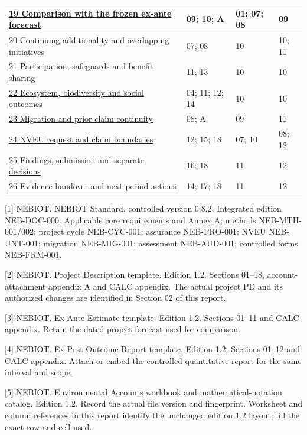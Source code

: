 {\begin{longtable}{@{}P{83mm}P{26mm}P{24mm}P{24mm}@{}}
\hyperref[mr:19]{19 Comparison with the frozen ex-ante forecast} & 09; 10; A & 01; 07; 08 & 09\\\hline
\hyperref[mr:20]{20 Continuing additionality and overlapping initiatives} & 07; 08 & 10 & 10; 11\\\hline
\hyperref[mr:21]{21 Participation, safeguards and benefit-sharing} & 11; 13 & 10 & 10\\\hline
\hyperref[mr:22]{22 Ecosystem, biodiversity and social outcomes} & 04; 11; 12; 14 & 10 & 10\\\hline
\hyperref[mr:23]{23 Migration and prior claim continuity} & 08; A & 09 & 11\\\hline
\hyperref[mr:24]{24 NVEU request and claim boundaries} & 12; 15; 18 & 07; 10 & 08; 12\\\hline
\hyperref[mr:25]{25 Findings, submission and separate decisions} & 16; 18 & 11 & 12\\\hline
\hyperref[mr:26]{26 Evidence handover and next-period actions} & 14; 17; 18 & 11 & 12\\\hline
\end{longtable}}
[1] NEBIOT. NEBIOT Standard, controlled version 0.8.2. Integrated edition NEB-DOC-000. Applicable core requirements and Annex A; methods NEB-MTH-001/002; project cycle NEB-CYC-001; assurance NEB-PRO-001; NVEU NEB-UNT-001; migration NEB-MIG-001; assessment NEB-AUD-001; controlled forms NEB-FRM-001.\par\vspace{2mm}
[2] NEBIOT. Project Description template. Edition 1.2. Sections 01–18, account-attachment appendix A and CALC appendix. The actual project PD and its authorized changes are identified in Section 02 of this report.\par\vspace{2mm}
[3] NEBIOT. Ex-Ante Estimate template. Edition 1.2. Sections 01–11 and CALC appendix. Retain the dated project forecast used for comparison.\par\vspace{2mm}
[4] NEBIOT. Ex-Post Outcome Report template. Edition 1.2. Sections 01–12 and CALC appendix. Attach or embed the controlled quantitative report for the same interval and scope.\par\vspace{2mm}
[5] NEBIOT. Environmental Accounts workbook and mathematical-notation catalog. Edition 1.2. Record the actual file version and fingerprint. Worksheet and column references in this report identify the unchanged edition 1.2 layout; fill the exact row and cell used.\par\vspace{2mm}
